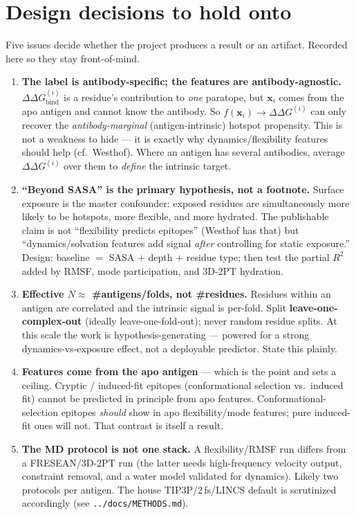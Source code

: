 \section{Design decisions to hold onto}\label{sec:design}

Five issues decide whether the project produces a result or an artifact. Recorded here so they
stay front-of-mind.

\begin{enumerate}
  \item \textbf{The label is antibody-specific; the features are antibody-agnostic.}
  $\Delta\Delta G_\mathrm{bind}^{(i)}$ is a residue's contribution to \emph{one} paratope, but
  $\mathbf{x}_i$ comes from the apo antigen and cannot know the antibody. So
  $f(\mathbf{x}_i)\to\Delta\Delta G^{(i)}$ can only recover the \emph{antibody-marginal}
  (antigen-intrinsic) hotspot propensity. This is not a weakness to hide --- it is exactly why
  dynamics/flexibility features should help (cf.~Westhof). Where an antigen has several antibodies,
  average $\Delta\Delta G^{(i)}$ over them to \emph{define} the intrinsic target.

  \item \textbf{``Beyond SASA'' is the primary hypothesis, not a footnote.} Surface exposure is the
  master confounder: exposed residues are simultaneously more likely to be hotspots, more flexible,
  and more hydrated. The publishable claim is not ``flexibility predicts epitopes'' (Westhof has
  that) but ``dynamics/solvation features add signal \emph{after} controlling for static exposure.''
  Design: baseline $=$ SASA $+$ depth $+$ residue type; then test the partial $R^2$ added by RMSF,
  mode participation, and 3D-2PT hydration.

  \item \textbf{Effective $N \approx$ \#antigens/folds, not \#residues.} Residues within an antigen
  are correlated and the intrinsic signal is per-fold. Split \textbf{leave-one-complex-out} (ideally
  leave-one-fold-out); never random residue splits. At this scale the work is hypothesis-generating
  --- powered for a strong dynamics-vs-exposure effect, not a deployable predictor. State this plainly.

  \item \textbf{Features come from the apo antigen} --- which is the point and sets a ceiling.
  Cryptic / induced-fit epitopes (conformational selection vs.\ induced fit) cannot be predicted in
  principle from apo features. Conformational-selection epitopes \emph{should} show in apo
  flexibility/mode features; pure induced-fit ones will not. That contrast is itself a result.

  \item \textbf{The MD protocol is not one stack.} A flexibility/RMSF run differs from a
  FRESEAN/3D-2PT run (the latter needs high-frequency velocity output, constraint removal, and a
  water model validated for dynamics). Likely two protocols per antigen. The house TIP3P/2\,fs/LINCS
  default is scrutinized accordingly (see \texttt{../docs/METHODS.md}).
\end{enumerate}
